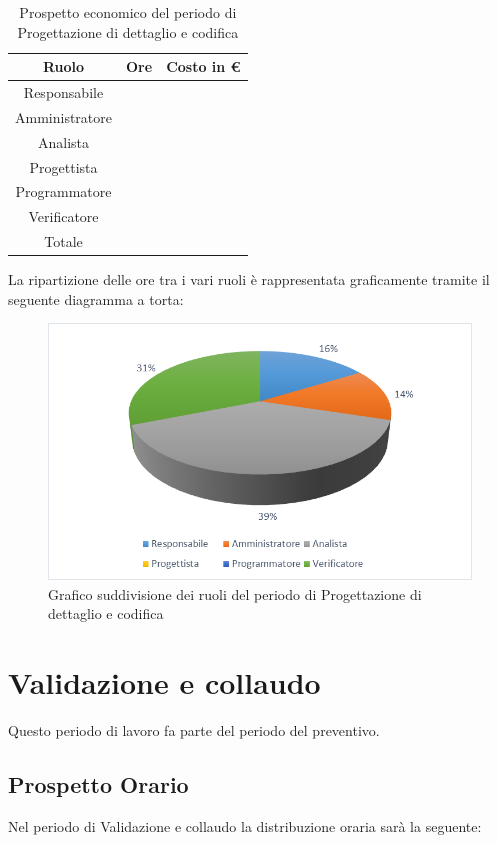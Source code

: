 \documentclass[./PianodiProgetto.tex]{subfiles}
\begin{document}
\begin{table}[H]
	\centering
	\begin{tabular}{|c|c|c|}
		\hline
		Ruolo&Ore&Costo in € \\ \hline
		Responsabile& &  \\ \hline
		Amministratore& &  \\ \hline
		Analista& &  \\ \hline
		Progettista& &  \\ \hline
		Programmatore& &  \\ \hline
		Verificatore& &  \\ \hline
		Totale& & \\ \hline
	\end{tabular}
	\caption{Prospetto economico del periodo di Progettazione di dettaglio e codifica}
\end{table}

La ripartizione delle ore tra i vari ruoli è rappresentata graficamente tramite il seguente diagramma a torta:

\begin{figure}[H]
	\centering
	\includegraphics[width=1\linewidth]{img/grafici/ProgettazioneDettaglioCodificaProspettoEconomico}
	\caption{Grafico suddivisione dei ruoli del periodo di Progettazione di dettaglio e codifica}
	\label{fig:progettazione-dettaglio-codifica-prospetto-economico}
\end{figure}

\section{Validazione e collaudo}
Questo periodo di lavoro fa parte del periodo del preventivo.
\subsection{Prospetto Orario}
Nel periodo di Validazione e collaudo la distribuzione oraria sarà la seguente:
\end{document}
